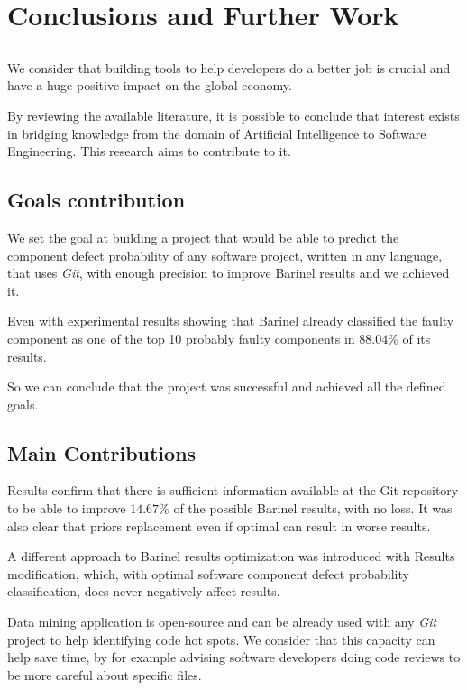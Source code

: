 \chapter{Conclusions and Further Work} \label{chap:conclusions}

\section*{}

We consider that building tools to help developers do a better job is crucial and have a huge positive impact on the global economy. 

By reviewing the available literature, it is possible to conclude that interest exists in bridging knowledge from the domain of Artificial Intelligence to Software Engineering.
This research aims to contribute to it.


\section{Goals contribution}

We set the goal at building a project that would be able to predict the component defect probability of any software project, written in any language, that uses \emph{Git}, with enough precision to improve Barinel results and we achieved it. 

Even with experimental results showing that Barinel already classified the faulty component as one of the top 10 probably faulty components in $88.04\%$ of its results. 

So we can conclude that the project was successful and achieved all the defined goals.


\section{Main Contributions}

Results confirm that there is sufficient information available at the Git repository to be able to improve $14.67\%$ of the possible Barinel results, with no loss. It was also clear that priors replacement even if optimal can result in worse results.

A different approach to Barinel results optimization was introduced with Results modification, which, with optimal software component defect probability classification, does never negatively affect results.

Data mining application is open-source and can be already used with any \emph{Git} project to help identifying code hot spots. We consider that this capacity can help save time, by for example advising software developers doing code reviews to be more careful about specific files.


